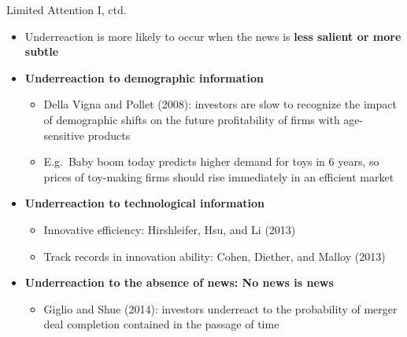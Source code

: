 \documentclass[aspectratio=169, 11pt]{beamer}
\begin{document}
\begin{frame}[shrink=5]{Limited Attention I, ctd.}
\begin{itemize}
\item Underreaction is more likely to occur when the news is \textbf{less salient or more subtle} 
\item \textbf{Underreaction to demographic information}
  \begin{itemize}
  \item Della Vigna and Pollet (2008): investors are slow to recognize the impact of demographic shifts on the future profitability of firms with age-sensitive products
  \item E.g.\ Baby boom today predicts higher demand for toys in 6 years, so prices of toy-making firms should rise immediately in an efficient market
  \end{itemize}
\item \textbf{Underreaction to technological information}
  \begin{itemize}
  \item Innovative efficiency: Hirshleifer, Hsu, and Li (2013)
  \item Track records in innovation ability: Cohen, Diether, and Malloy (2013)
  \end{itemize}
\item \textbf{Underreaction to the absence of news: No news is news}
  \begin{itemize}
  \item Giglio and Shue (2014): investors underreact to the probability of merger deal completion contained in the passage of time
  \end{itemize}
\end{itemize}
\end{frame}
\end{document}

